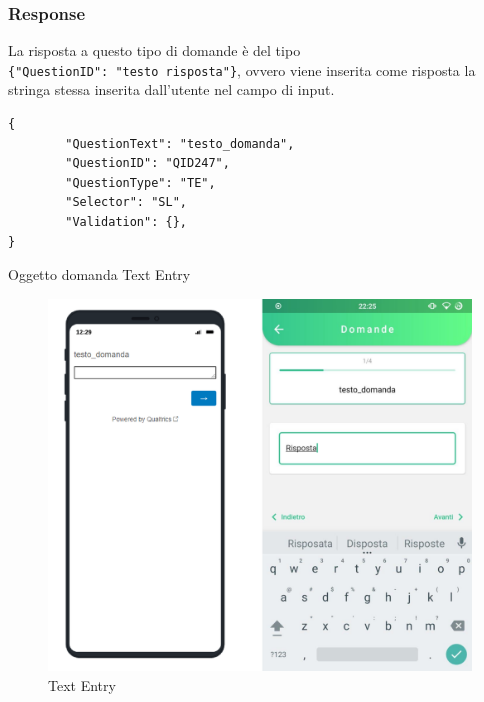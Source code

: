 \subsubsection{Response}
La risposta a questo tipo di domande è del tipo\\ \texttt{\{"QuestionID": "testo risposta"\}}, ovvero viene inserita come risposta la stringa stessa inserita dall'utente nel campo di input.

\newpage
\begin{json}
\begin{verbatim}
{
        "QuestionText": "testo_domanda",
        "QuestionID": "QID247",
        "QuestionType": "TE",
        "Selector": "SL",
        "Validation": {},
}
\end{verbatim}
\caption{Oggetto domanda Text Entry}
\label{json:text_entry}
\end{json}

\begin{figure}[h]
\centering
\includegraphics[width=\textwidth]{img/text_entry_flutter}
\caption{Text Entry}
\label{fig:text_entry}
\end{figure}

\newpage
